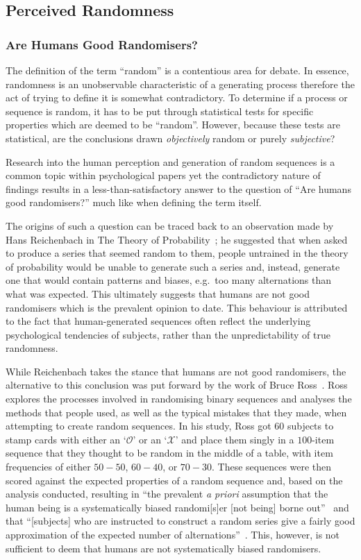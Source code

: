 \subsection{Perceived Randomness}\label{subsection:perceived_randomness}
\subsubsection{Are Humans Good Randomisers?}\label{subsubsection:are_humans_good_randomisers}
The definition of the term ``random'' is a contentious area for debate. In essence, randomness is an unobservable characteristic of a generating process therefore the act of trying to define it is somewhat contradictory. To determine if a process or sequence is random, it has to be put through statistical tests for specific properties which are deemed to be ``random''. However, because these tests are statistical, are the conclusions drawn \textit{objectively} random or purely \textit{subjective}?

Research into the human perception and generation of random sequences is a common topic within psychological papers yet the contradictory nature of findings results in a less-than-satisfactory answer to the question of ``Are humans good randomisers?'' \textendash{} much like when defining the term itself.

The origins of such a question can be traced back to an observation made by Hans Reichenbach in The Theory of Probability~\cite{reichenbach:1949}; he suggested that when asked to produce a series that seemed random to them, people untrained in the theory of probability would be unable to generate such a series and, instead, generate one that would contain patterns and biases, e.g.\ too many alternations than what was expected. This ultimately suggests that humans are not good randomisers which is the prevalent opinion to date. This behaviour is attributed to the fact that human-generated sequences often reflect the underlying psychological tendencies of subjects, rather than the unpredictability of true randomness.

While Reichenbach takes the stance that humans are not good randomisers, the alternative to this conclusion was put forward by the work of Bruce Ross~\cite{ross:1955}. Ross explores the processes involved in randomising binary sequences and analyses the methods that people used, as well as the typical mistakes that they made, when attempting to create random sequences. In his study, Ross got 60 subjects to stamp cards with either an `$\mathcal{O}$' or an `$\mathcal{X}$' and place them singly in a $100$-item sequence that they thought to be random in the middle of a table, with item frequencies of either $50-50$, $60-40$, or $70-30$. These sequences were then scored against the expected properties of a random sequence and, based on the analysis conducted, resulting in ``the prevalent \textit{a priori} assumption that the human being is a systematically biased randomi[s]er [not being] borne out''~\cite{ross:1955} and that ``[subjects] who are instructed to construct a random series give a fairly good approximation of the expected number of alternations''~\cite{bakan:1960}. This, however, is not sufficient to deem that humans are not systematically biased randomisers.

